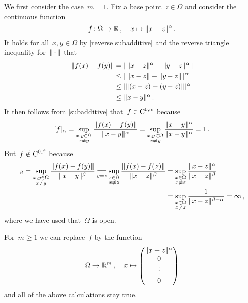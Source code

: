 We first consider the case~$m = 1$.
Fix a base point~$z \in \Omega$ and consider the continuous function
\[
          f
  \colon  \Omega
  \to     \mathbb{R} \,,
  \quad   x
  \mapsto \lVert x - z\rVert^\alpha \,.
\]
It holds for all~$x, y \in \Omega$ by \cref{reverse subadditive} and the reverse triangle inequality for~$\lVert\,\cdot\,\rVert$ that
\begin{align*}
        \lVert f(x) - f(y)\rVert
  &=    \lvert\, \lVert x-z\rVert^\alpha - \lVert y-z\rVert^\alpha \,\rvert \\
  &\leq \lvert \, \lVert x-z\rVert - \lVert y-z\rVert \, \rvert^\alpha  \\
  &\leq \lvert \lVert (x-z) - (y-z) \rVert \rvert^\alpha \\
  &\leq \lVert x-y\rVert^\alpha \,.
\end{align*}
It then follows from \cref{subadditive} that~$f \in \operatorname{C}^{0,\alpha}$ because
\[
    [f]_\alpha
  = \sup_{\substack{x, y \in \Omega \\ x \neq y}}
    \frac{\lVert f(x) - f(y)\rVert}{\lVert x-y\rVert^\alpha}
  = \sup_{\substack{x, y \in \Omega \\ x \neq y}}
    \frac{\lVert x-y\rVert^\alpha}{\lVert x-y\rVert^\alpha}
  = 1 \,.
\]
But~$f \notin \operatorname{C}^{0,\beta}$ because
\begin{align*}
    [f]_\beta
   =
    \sup_{\substack{x, y \in \Omega \\ x \neq y}}
    \frac{\norm{f(x) - f(y)}}{\norm{x-y}^\beta}
   \mathbin{\underset{y=z}{=\!=}}
    \sup_{\substack{x \in \Omega \\ x \neq z}}
    \frac{\norm{f(x) - f(z)}}{\norm{x-z}^\beta}
  &=
    \sup_{\substack{x \in \Omega \\ x \neq z}}
    \frac{\norm{x-z}^\alpha}{\norm{x-z}^\beta}  \\
  &=
    \sup_{\substack{x \in \Omega \\ x \neq z}}
    \frac{1}{\norm{x-z}^{\beta - \alpha}}
   =
    \infty \,,
\end{align*}
where we have used that~$\Omega$ is open.

For~$m \geq 1$ we can replace~$f$ by the function
\[
          \Omega
  \to     \mathbb{R}^m \,,
  \quad   x
  \mapsto \begin{pmatrix}  \lVert x-z\rVert^\alpha \\ 0 \\ \vdots \\ 0  \end{pmatrix}
\]
and all of the above calculations stay true.





\addtocounter{subsection}{1}




